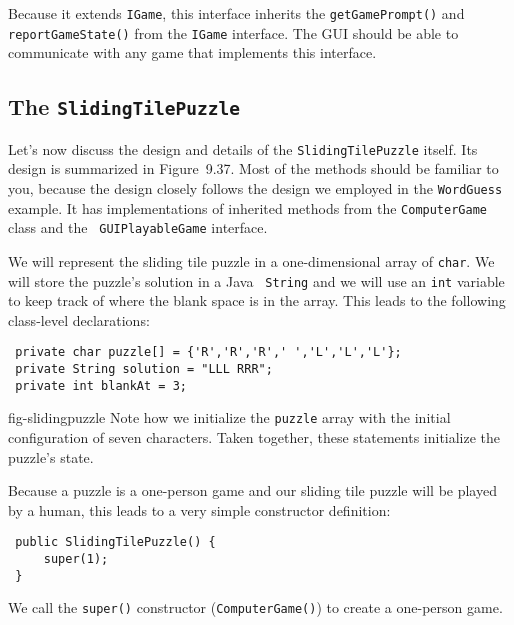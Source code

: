 \noindent Because it extends {\tt IGame}, this interface inherits the
{\tt getGamePrompt()} and {\tt report\-Game\-State()} from the {\tt IGame}
interface. The GUI should be able to communicate with any game that
implements this interface.

\subsection{The {\tt SlidingTilePuzzle}}

Let's now discuss the design and details of the 
{\tt SlidingTilePuzzle} itself. Its design is summarized in
Figure~9.37.  Most of the methods should be familiar
to you, because the design closely follows the design we employed in
the {\tt WordGuess} example. It has implementations of inherited
methods from the {\tt ComputerGame} class and the {\tt
GUIPlayableGame} interface.  

We will represent the sliding tile puzzle in a one-dimensional array
of {\tt char}. We will store the puzzle's solution in a Java {\tt
String} and we will use an {\tt int} variable to keep track of where
the blank space is in the array.  This leads to the following
class-level declarations:

\begin{jjjlisting}
\begin{lstlisting}
 private char puzzle[] = {'R','R','R',' ','L','L','L'};
 private String solution = "LLL RRR";
 private int blankAt = 3;
\end{lstlisting}
\end{jjjlisting}

{fig-slidingpuzzle}
\noindent Note how we initialize the {\tt puzzle} array with the
initial configuration of seven characters. Taken together, these
statements initialize the puzzle's state.

Because a puzzle is a one-person game and our sliding tile puzzle will be
played by a human, this leads to a very simple constructor 
definition:

\begin{jjjlisting}
\begin{lstlisting}
 public SlidingTilePuzzle() {
     super(1);
 }
\end{lstlisting}
\end{jjjlisting}

\noindent We call the {\tt super()} constructor ({\tt ComputerGame()})
to create a one-person game.


